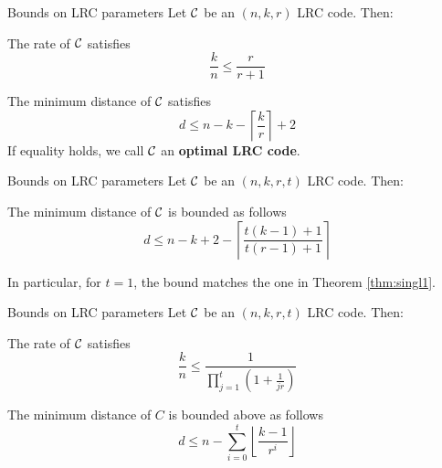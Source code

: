 \begin{frame}{Bounds on LRC parameters}
	Let $\mathcal{C}$ be an $(n,k,r)$ LRC code. Then:
    \begin{thm}
        The rate of $\mathcal{C}$ satisfies
        $$ \frac{k}{n} \leq \frac{r}{r+1} $$
    \end{thm}
    
    \begin{thm}
        \label{thm:singl1}
        The minimum distance of $\mathcal{C}$ satisfies
            $$d \leq n - k - \left\lceil \frac{k}{r} \right\rceil + 2$$
        If equality holds, we call $\mathcal{C}$ an \textbf{optimal LRC code}.
    \end{thm}
\end{frame}

\begin{frame}{Bounds on LRC parameters}
Let $\mathcal{C}$ be an $(n,k,r,t)$ LRC code. Then:
    \begin{thm}
        \label{thm:singl2}
        The minimum distance of $\mathcal{C}$ is bounded as follows
        $$d \leq n - k + 2 - \left\lceil \frac{t(k-1)+1}{t(r-1)+1} \right\rceil $$
    \end{thm}
    
    In particular, for $t=1$, the bound matches the one in Theorem \ref{thm:singl1}.
    
\end{frame}



\begin{frame}{Bounds on LRC parameters}
    Let $\mathcal{C}$ be an $(n,k,r,t)$ LRC code. Then:
    \begin{thm}
        \label{thm:max_rate_t}
        The rate of $\mathcal{C}$ satisfies
        $$ \frac{k}{n} \leq \frac{1}{\prod_{j=1}^{t} (1 + \frac{1}{jr} )} $$
    \end{thm}
    
    \begin{thm}
        \label{thm:min_dist_t}
        The minimum distance of $C$ is bounded above as follows
        $$ d \leq n - \sum_{i=0}^{t} \left\lfloor \frac{k-1}{r^i} \right\rfloor $$
    \end{thm}
\end{frame}   





